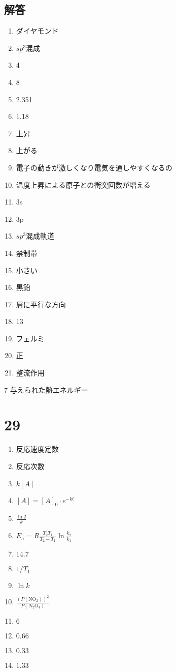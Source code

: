 \documentclass[dvipdfmx]{article}
\begin{document}
  \subsection*{解答}
    \begin{enumerate}
      \item ダイヤモンド 
      \item $sp^3$混成 
      \item 4
      \item 8
      \item 2.351
      \item 1.18
      \item 上昇
      \item 上がる
      \item 電子の動きが激しくなり電気を通しやすくなるの
      \item 温度上昇による原子との衝突回数が増える
      \item 3s
      \item 3p
      \item $sp^3$混成軌道
      \item 禁制帯
      \item 小さい
      \item 黒鉛
      \item 層に平行な方向
      \item 13
      \item フェルミ
      \item 正
      \item 整流作用
    \end{enumerate}

    7 与えられた熱エネルギー
    \section*{29}
    \begin{enumerate}
      \item 反応速度定数
      \item 反応次数
      \item $k[A]$
      \item $[A] = [A]_0 \cdot e^{-kt}$
      \item $\frac{\ln 2}{k}$
      \item $E_a = R\frac{T_2 T_1}{T_2 - T_1} \ln \frac{k_2}{k_1}$
      \item $14.7$
      \item $1/T_1$
      \item $\ln k$
      \item $\frac{(P(\mathrm{NO_2}))^2}{P(N_2O_4)}$
      \item $6$
      \item $0.66$
      \item $0.33$
      \item $1.33$
    \end{enumerate}
\end{document}
